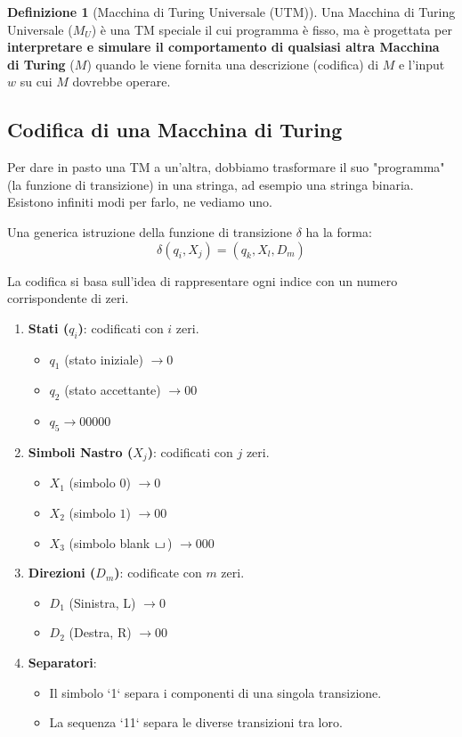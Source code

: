 \documentclass[a4paper]{article}
\theoremstyle{definition} %
\newtheorem{definition}{Definizione}
\newcommand{\blankS}{\ensuremath{\raisebox{-0.15ex}{\scalebox{1.3}[0.7]{$\sqcup$}}\mkern2mu}}
\theoremstyle{remark} %
\begin{document}
\begin{definition}[Macchina di Turing Universale (UTM)]
Una Macchina di Turing Universale ($M_U$) è una TM speciale il cui programma è fisso, ma è progettata per \textbf{interpretare e simulare il comportamento di qualsiasi altra Macchina di Turing} ($M$) quando le viene fornita una descrizione (codifica) di $M$ e l'input $w$ su cui $M$ dovrebbe operare.
\end{definition}

\subsection{Codifica di una Macchina di Turing}

Per dare in pasto una TM a un'altra, dobbiamo trasformare il suo "programma" (la funzione di transizione) in una stringa, ad esempio una stringa binaria. Esistono infiniti modi per farlo, ne vediamo uno.

Una generica istruzione della funzione di transizione $\delta$ ha la forma:
\[ \delta(q_i, X_j) = (q_k, X_l, D_m) \]

La codifica si basa sull'idea di rappresentare ogni indice con un numero corrispondente di zeri.
\begin{enumerate}
    \item \textbf{Stati ($q_i$)}: codificati con $i$ zeri.
    \begin{itemize}
        \item $q_1$ (stato iniziale) $\rightarrow 0$
        \item $q_2$ (stato accettante) $\rightarrow 00$
        \item $q_5 \rightarrow 00000$
    \end{itemize}
    \item \textbf{Simboli Nastro ($X_j$)}: codificati con $j$ zeri.
    \begin{itemize}
        \item $X_1$ (simbolo $0$) $\rightarrow 0$
        \item $X_2$ (simbolo $1$) $\rightarrow 00$
        \item $X_3$ (simbolo blank $\blankS$) $\rightarrow 000$
    \end{itemize}
    \item \textbf{Direzioni ($D_m$)}: codificate con $m$ zeri.
    \begin{itemize}
        \item $D_1$ (Sinistra, L) $\rightarrow 0$
        \item $D_2$ (Destra, R) $\rightarrow 00$
    \end{itemize}
    \item \textbf{Separatori}:
    \begin{itemize}
        \item Il simbolo `1` separa i componenti di una singola transizione.
        \item La sequenza `11` separa le diverse transizioni tra loro.
    \end{itemize}
\end{enumerate}
\end{document}
